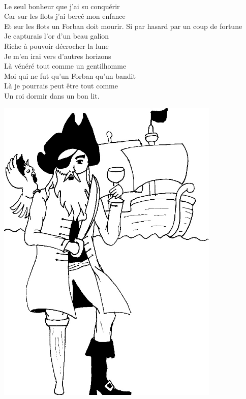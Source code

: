 \\Le seul bonheur que j'ai su conquérir
\\Car sur les flots j'ai bercé mon enfance
\\Et sur les flots un Forban doit mourir.
\breakpage
Si par hasard par un coup de fortune
\\Je capturais l'or d'un beau galion
\\Riche à pouvoir décrocher la lune
\\Je m'en irai vers d'autres horizons
\\Là vénéré tout comme un gentilhomme
\\Moi qui ne fut qu'un Forban qu'un bandit
\\Là je pourrais peut être tout comme
\\Un roi dormir dans un bon lit.
\\
\begin{center}
\includegraphics[width=0.8\textwidth]{images/chant_corsaire.jpg}
\end{center}

\breakpage